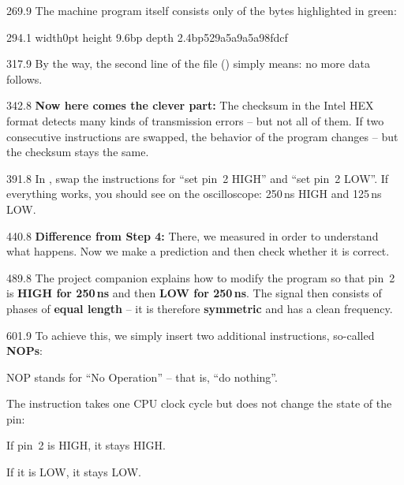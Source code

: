 \documentclass{aslab}
\begin{document}
\begin{region}{269.9}
The machine program itself consists only of the bytes highlighted in green:
\end{region}

\begin{region}{294.1}
{\setlength\fboxsep{0pt}\colorbox{hlgreen!45}{\vrule width0pt height 9.6bp
  depth 2.4bp\ttfamily 529a5a9a5a98fdcf}}
\end{region}

\begin{region}{317.9}
By the way, the second line of the file () simply means:
no more data follows.
\end{region}

\begin{region}{342.8}
\textbf{Now here comes the clever part:} The checksum in the Intel HEX
format detects many kinds of transmission errors -- but not all of them. If
two consecutive instructions are swapped, the behavior of the program
changes -- but the checksum stays the same.
\end{region}

\begin{region}{391.8}
In , swap the instructions for ``set pin~2 HIGH'' and
``set pin~2 LOW''. If everything works, you should see on the oscilloscope:
250\,ns HIGH and 125\,ns LOW.
\end{region}

\begin{region}{440.8}
\textbf{Difference from Step 4:} There, we measured in order to understand
what happens. Now we make a prediction and then check whether it is
correct.
\end{region}


\begin{region}[width=294,pitch=12.95]{489.8}
\blank
The project companion explains how to modify the program so that pin~2 is
\textbf{HIGH for 250\,ns} and then \textbf{LOW for 250\,ns}.
\blank
The signal then consists of phases of \textbf{equal length} -- it is
therefore \textbf{symmetric} and has a clean frequency.
\end{region}

\begin{region}[width=294]{601.9}
To achieve this, we simply insert two additional instructions, so-called
\textbf{NOPs}:
\begin{dashlist}
\item NOP stands for ``No Operation'' -- that is, ``do nothing''.
\item The instruction takes one CPU clock cycle but does not change
  the state of the pin:
  \begin{dashlist}
  \item If pin~2 is HIGH, it stays HIGH.
  \item If it is LOW, it stays LOW.
  \end{dashlist}
\end{dashlist}
\end{region}
\end{document}
